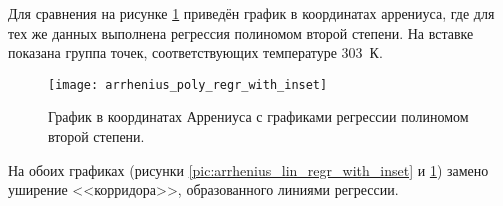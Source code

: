 	Для сравнения на рисунке \ref{pic:arrhenius_poly_regr_with_inset} приведён
	график в координатах аррениуса, где для тех же данных выполнена регрессия
	полиномом второй степени. На вставке показана группа точек, соответствующих 
	температуре 303~К.

	\begin{figure}[!htp]
		\centering
		\texttt{[image: arrhenius\_poly\_regr\_with\_inset]}
		\caption{График в координатах Аррениуса с графиками регрессии
		         полиномом второй степени.}
		\label{pic:arrhenius_poly_regr_with_inset}
	\end{figure}

	На обоих графиках (рисунки \ref{pic:arrhenius_lin_regr_with_inset} и 
	\ref{pic:arrhenius_poly_regr_with_inset}) замено уширение <<корридора>>,
	образованного линиями регрессии.